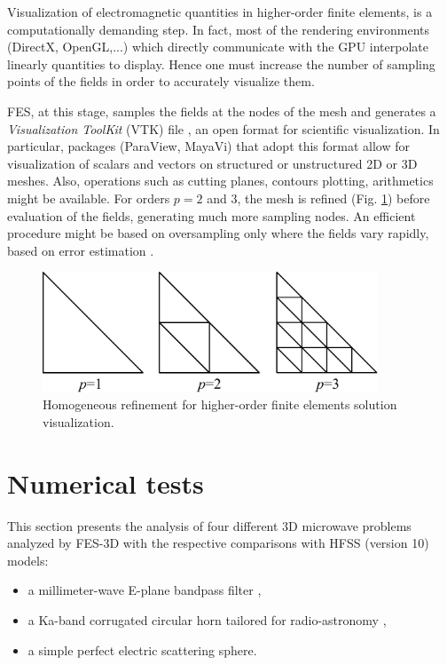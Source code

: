 Visualization of electromagnetic quantities in higher-order finite elements, is a computationally demanding step. In fact, most of the rendering environments (DirectX, OpenGL,...) which directly communicate with the GPU interpolate linearly quantities to display. Hence one must increase the number of sampling points of the fields in order to accurately visualize them. 

FES, at this stage, samples the fields at the nodes of the mesh and generates a \textit{Visualization ToolKit} (VTK) file \cite{VTK4}, an open format for scientific visualization. In particular, packages (ParaView, MayaVi) that adopt this format allow for visualization of scalars and vectors on structured or unstructured 2D or 3D meshes. Also, operations such as cutting planes, contours plotting, arithmetics might be available. For orders $p=2$ and $3$, the mesh is refined (Fig. \ref{fig:Refinement}) before evaluation of the fields, generating much more sampling nodes. An efficient procedure might be based on oversampling only where the fields vary rapidly, based on error estimation \cite{remacle2007efficient}. 

\begin{figure}[ht!]
\centering
\includegraphics[width=10cm]{Refinement}
\caption{Homogeneous refinement for higher-order finite elements solution visualization.}
\label{fig:Refinement}
\end{figure}

\section{Numerical tests}

This section presents the analysis of four different 3D microwave problems analyzed by FES-3D with the respective comparisons with HFSS (version 10) models:
\begin{itemize}
\item a millimeter-wave E-plane bandpass filter \cite{bui1984broad},
\item a Ka-band corrugated circular horn tailored for radio-astronomy \cite{lucci2005corrugated}, 
\item a simple perfect electric scattering sphere.
\end{itemize}

